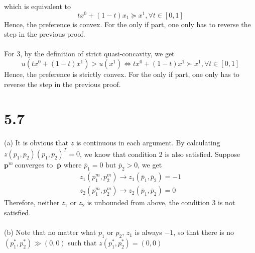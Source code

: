 \documentclass[12pt]{article}
\begin{document}
which is equivalent to 
\begin{equation*}
tx^0+(1-t)x_1\succeq x^1, \forall t \in[0,1]
\end{equation*}
Hence, the preference is convex. For the only if part, one only has to reverse the step in the previous proof.\\
\\
For $3$, by the definition of strict quasi-concavity, we get
\begin{equation*}
u(tx^0+(1-t)x^1)>u(x^1)\Leftrightarrow tx^0+(1-t)x^1\succ x^1, \forall t\in[0,1]
\end{equation*}
Hence, the preference is strictly convex. For the only if part, one only has to reverse the step in the previous proof.

\section*{5.7}
(a) It is obvious that $z$ is continuous in each argument. By calculating $z(p_1,p_2)(p_1,p_2)^T=0$, we know that condition 2 is also satisfied. Suppose $\mathbf{p}^{m} \:\text{converges to }\: \overline{\mathbf{p}} \text { where } \overline{p}_{1}=0 \text { but } \overline{p}_{2}>0$, we get
\begin{equation*}
\begin{array}{l}{z_{1}\left(p_{1}^{m}, p_{2}^{m}\right) \rightarrow z_{1}\left(\overline{p}_{1}, \overline{p}_{2}\right)=-1} \\ {z_{2}\left(p_{1}^{m}, p_{2}^{m}\right) \rightarrow z_{2}\left(\overline{p}_{1}, \overline{p}_{2}\right)=0}\end{array}
\end{equation*}
Therefore, neither $z_1$ or $z_2$ is unbounded from above, the condition 3 is not satisfied.\\
\\
(b) Note that no matter what $p_1$ or $p_2$, $z_1$ is always $-1$, so that there is no $(p_1^*,p_2^*)\gg (0,0)$ such that $z(p_1^*,p_2^*)=(0,0)$
\end{document}
